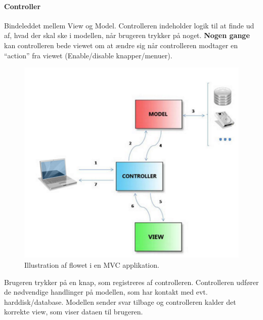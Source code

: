 \paragraph{Controller} Bindeleddet mellem View og Model. Controlleren indeholder logik til at finde ud af, hvad der skal ske i modellen, når brugeren trykker på noget. \textbf{Nogen gange} kan controlleren bede viewet om at ændre sig når controlleren modtager en “action” fra viewet (Enable/disable knapper/menuer).\\	

\begin{figure}[h]
	\centering
	\includegraphics[width=0.7\linewidth]{figs/mvcFlow}
	\caption[Illustration af flowet i en MVC applikation]{Illustration af flowet i en MVC applikation.}
	\label{fig:mvcFlow}
\end{figure}

Brugeren trykker på en knap, som registreres af controlleren. Controlleren udfører de nødvendige handlinger på modellen, som har kontakt med evt. harddisk/database. Modellen sender svar tilbage og controlleren kalder det korrekte view, som viser dataen til brugeren.


